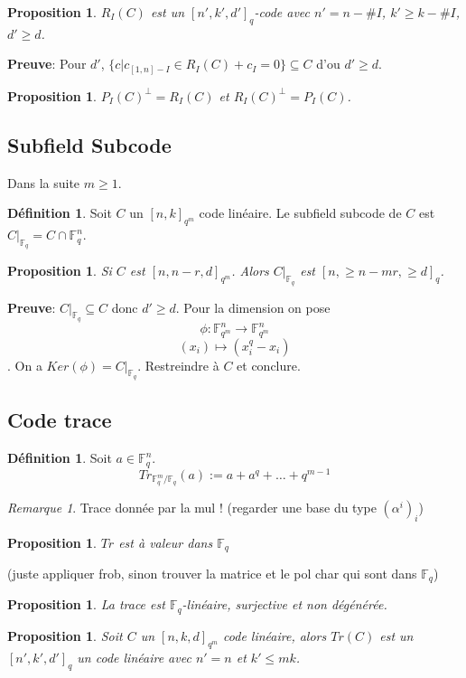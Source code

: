 \documentclass[12pt]{article}
\theoremstyle{plain}
\newtheorem{prop}[subsubsection]{Proposition}
\theoremstyle{definition}
\newtheorem{defn}[subsubsection]{D\'efinition}
\theoremstyle{remark}
\newtheorem{rem}{Remarque}
\newcommand{\F}{\mathbb{F}}
\begin{document}
\begin{prop}
    $R_I(C)$ est un $[n', k', d']_q$-code avec
    $n'=n-\#I$, $k'\geq k-\#I$, $d'\geq d$.
\end{prop}
\textbf{Preuve}: Pour $d'$, $\{c|c_{[1,n]-I}\in R_I(C)+c_I=0\}\subseteq C$ d'ou $d'\geq d$.

\begin{prop}
    $P_I(C)^{\perp}=R_I(C)$ et $R_I(C)^{\perp}=P_I(C)$.
\end{prop}
\subsection{Subfield Subcode}
Dans la suite $m\geq1$. 
\begin{defn}
    Soit $C$ un $[n,k]_{q^m}$ code linéaire. Le subfield subcode de $C$ est 
    $C|_{\F_q}=C\cap \F_q^n$.
\end{defn}
\begin{prop}
    Si $C$ est $[n,n-r,d]_{q^m}$. Alors $C|_{\F_q}$ est $[n,\geq n-mr,\geq d]_q$.
\end{prop}
\textbf{Preuve}: $C|_{\F_q}\subseteq C$ donc $d'\geq d$. Pour la dimension
on pose \[\phi:\F_{q^m}^n\to\F_{q^m}^n\]\[(x_i)\mapsto (x_i^q-x_i)\]. On a 
$Ker(\phi)=C|_{\F_q}$. Restreindre à $C$ et conclure.

\subsection{Code trace}
\begin{defn}
    Soit $a\in \F_q^n$. \[Tr_{\F_q^m/\F_q}(a):= a+a^q+\ldots+q^{m-1}\]
\end{defn}
\begin{rem}
    Trace donnée par la mul ! (regarder une base du type $(\alpha^i)_i$)
\end{rem}

\begin{prop}
    $Tr$ est à valeur dans $\F_q$
\end{prop}
(juste appliquer frob, sinon trouver la matrice et le pol char qui sont dans $\F_q$)

\begin{prop}
    La trace est $\F_q$-linéaire, surjective et non dégénérée.
\end{prop}

\begin{prop}
    Soit $C$ un $[n,k,d]_{q^m}$ code linéaire, alors $Tr(C)$ est un 
    $[n',k',d']_q$ un code linéaire avec $n'=n$ et $k'\leq mk$.
\end{prop}
\end{document}
